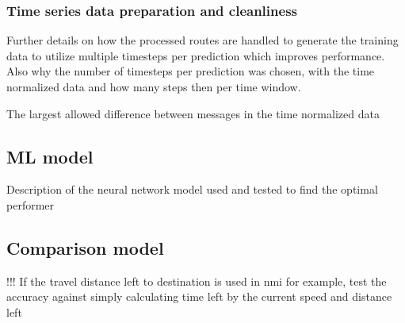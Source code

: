 \documentclass[../main.tex]{subfiles}
\begin{document}
\subsubsection{Time series data preparation and cleanliness}

Further details on how the processed routes are handled to generate the training data to utilize multiple timesteps per prediction which improves performance. Also why the number of timesteps per prediction was chosen, with the time normalized data and how many steps then per time window. 

The largest allowed difference between messages in the time normalized data

\subsection{ML model}

Description of the neural network model used and tested to find the optimal performer


\subsection{Comparison model}

!!! If the travel distance left to destination is used in nmi for example, test the accuracy against simply calculating time left by the current speed and distance left 
\end{document}
